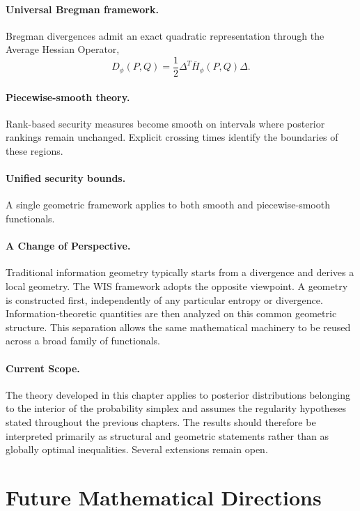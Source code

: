 \paragraph{Universal Bregman framework.}
Bregman divergences admit an exact quadratic representation through the
Average Hessian Operator,
\[ D_\phi(P,Q) = \frac12 \Delta^{T}
\overline H_\phi(P,Q) \Delta. \]

\paragraph{Piecewise-smooth theory.}
Rank-based security measures become smooth on intervals where posterior
rankings remain unchanged.  Explicit crossing times identify the
boundaries of these regions.

\paragraph{Unified security bounds.}
A single geometric framework applies to both smooth and piecewise-smooth
functionals.

\paragraph{A Change of Perspective.}
Traditional information geometry typically starts from a divergence and
derives a local geometry.  The WIS framework adopts the opposite
viewpoint.  A geometry is constructed first, independently of any
particular entropy or divergence.  Information-theoretic quantities are
then analyzed on this common geometric structure.  This separation
allows the same mathematical machinery to be reused across a broad
family of functionals.

\paragraph{Current Scope.}
The theory developed in this chapter applies to posterior distributions
belonging to the interior of the probability simplex and assumes the
regularity hypotheses stated throughout the previous chapters.  The
results should therefore be interpreted primarily as structural and
geometric statements rather than as globally optimal inequalities.
Several extensions remain open.

\section{Future Mathematical Directions}\label{ch:sec:future-mathematical-directions}

